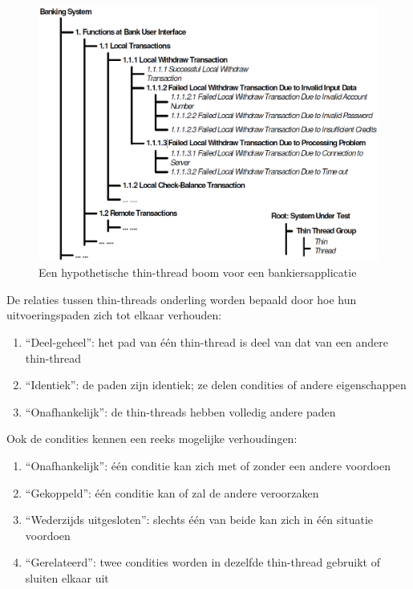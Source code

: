 \begin{figure}[h!]
    \centering
    \includegraphics[scale=0.45]{img/Tsai2001ThinThreadTree.png}
    \caption{Een hypothetische thin-thread boom voor een bankiersapplicatie \autocite{Tsai2001}}
    \label{fig:tsaithinthreadtree}
\end{figure}

De relaties tussen thin-threads onderling worden bepaald door hoe hun uitvoeringspaden zich tot elkaar verhouden:

\begin{enumerate}
    \item ``Deel-geheel'': het pad van één thin-thread is deel van dat van een andere thin-thread
    \item ``Identiek'': de paden zijn identiek; ze delen condities of andere eigenschappen
    \item ``Onafhankelijk'': de thin-threads hebben volledig andere paden
\end{enumerate}

Ook de condities kennen een reeks mogelijke verhoudingen:

\begin{enumerate}
    \item ``Onafhankelijk'': één conditie kan zich met of zonder een andere voordoen
    \item ``Gekoppeld'': één conditie kan of zal de andere veroorzaken
    \item ``Wederzijds uitgesloten'': slechts één van beide kan zich in één situatie voordoen
    \item ``Gerelateerd'': twee condities worden in dezelfde thin-thread gebruikt of sluiten elkaar uit
\end{enumerate}


